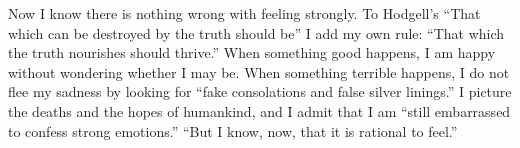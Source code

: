 Now I know there is nothing wrong with feeling strongly. To Hodgell's ``That which can be destroyed by the truth should be'' I add my own rule: ``That which the truth nourishes should thrive.'' When something good happens, I am happy without wondering whether I may be. When something terrible happens, I do not flee my sadness by looking for ``fake consolations and false silver linings.''  I picture the deaths and the hopes of humankind, and I admit that I am ``still embarrassed to confess strong emotions.'' ``But I know, now, that it is rational to feel.'' 
